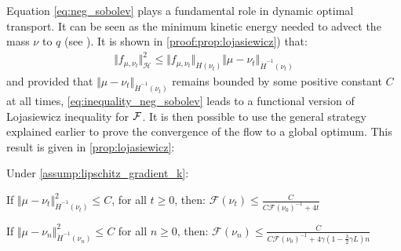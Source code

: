 Equation \cref{eq:neg_sobolev} plays a fundamental role in dynamic optimal transport. %
It can be seen as the minimum kinetic energy needed to advect the mass $\nu$ to $q$ (see \cite{mroueh2018regularized}). It is shown in \cref{proof:prop:lojasiewicz}) that:
\begin{align}\label{eq:inequality_neg_sobolev}
	\Vert f_{\mu,\nu_t} \Vert^2_{\mathcal{H}} \leq \Vert f_{\mu,\nu_t} \Vert_{\dot{H}(\nu_t)} \Vert  \mu -\nu_t\Vert_{\dot{H}^{-1}(\nu_t)}  
\end{align}
and provided that $\Vert \mu - \nu_t \Vert_{\dot{H}^{-1}(\nu_t)} $ remains bounded by some positive constant $C$ at all times, \cref{eq:inequality_neg_sobolev} leads to  a functional version of Lojasiewicz inequality for ${{\mathcal F}}$. 
It is then possible to use the general strategy explained earlier to prove the convergence of the flow to a global optimum. This result is given in \cref{prop:lojasiewicz}:
\begin{proposition}\label{prop:lojasiewicz}
		Under \cref{assump:lipschitz_gradient_k}:
		\begin{proplist}
			\item If $\Vert \mu - \nu_t \Vert^2_{\dot{H}^{-1}(\nu_t)} \leq C$, for all $t\geq 0$, then: $\mathcal{F}(\nu_t)\leq \frac{C}{C\mathcal{F}(\nu_0)^{-1} + 4t}$
			\item If $\Vert \mu - \nu_n \Vert^2_{\dot{H}^{-1}(\nu_n)} \leq C$ for all $n\geq 0$, then: $\mathcal{F}(\nu_n)\leq \frac{C}{C\mathcal{F}(\nu_0)^{-1} + 4\gamma(1-\frac{3}{2}\gamma L) n}$
		\end{proplist}
\end{proposition}
